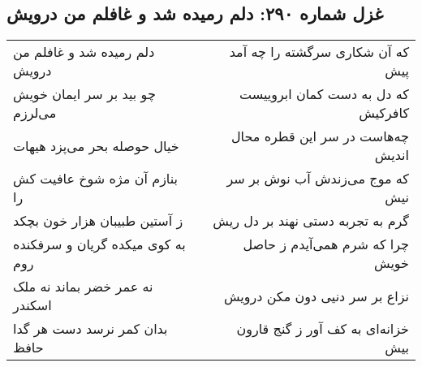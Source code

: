 \begin{center}
\section*{غزل شماره ۲۹۰: دلم رمیده شد و غافلم من درویش}
\label{sec:sh290}
\begin{longtable}{l p{0.5cm} r}
دلم رمیده شد و غافلم من درویش
&&
که آن شکاری سرگشته را چه آمد پیش
\\
چو بید بر سر ایمان خویش می‌لرزم
&&
که دل به دست کمان ابروییست کافرکیش
\\
خیال حوصله بحر می‌پزد هیهات
&&
چه‌هاست در سر این قطره محال اندیش
\\
بنازم آن مژه شوخ عافیت کش را
&&
که موج می‌زندش آب نوش بر سر نیش
\\
ز آستین طبیبان هزار خون بچکد
&&
گرم به تجربه دستی نهند بر دل ریش
\\
به کوی میکده گریان و سرفکنده روم
&&
چرا که شرم همی‌آیدم ز حاصل خویش
\\
نه عمر خضر بماند نه ملک اسکندر
&&
نزاع بر سر دنیی دون مکن درویش
\\
بدان کمر نرسد دست هر گدا حافظ
&&
خزانه‌ای به کف آور ز گنج قارون بیش
\\
\end{longtable}
\end{center}
